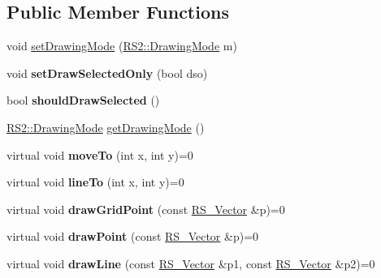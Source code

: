 \subsection*{Public Member Functions}
\begin{DoxyCompactItemize}
\item 
void \hyperlink{classRS__Painter_a88a1a453bc7e08f214052c3adf0503b8}{set\-Drawing\-Mode} (\hyperlink{classRS2_a67196f135592d0f8eff894bd126685b2}{R\-S2\-::\-Drawing\-Mode} m)
\item 
\hypertarget{classRS__Painter_a8d1570665fffca8525b17a549a551873}{void {\bfseries set\-Draw\-Selected\-Only} (bool dso)}\label{classRS__Painter_a8d1570665fffca8525b17a549a551873}

\item 
\hypertarget{classRS__Painter_a60040b54a2cf9f3c1a1b0adc8a96dd82}{bool {\bfseries should\-Draw\-Selected} ()}\label{classRS__Painter_a60040b54a2cf9f3c1a1b0adc8a96dd82}

\item 
\hyperlink{classRS2_a67196f135592d0f8eff894bd126685b2}{R\-S2\-::\-Drawing\-Mode} \hyperlink{classRS__Painter_a80521757acab6e423095a789074351a0}{get\-Drawing\-Mode} ()
\item 
\hypertarget{classRS__Painter_a0aad518b8aede9e847f9743ff474485a}{virtual void {\bfseries move\-To} (int x, int y)=0}\label{classRS__Painter_a0aad518b8aede9e847f9743ff474485a}

\item 
\hypertarget{classRS__Painter_a779a7272bbb90c16e84f2fc18efd2e09}{virtual void {\bfseries line\-To} (int x, int y)=0}\label{classRS__Painter_a779a7272bbb90c16e84f2fc18efd2e09}

\item 
\hypertarget{classRS__Painter_a68549b379070674f7b61b01ce84326f9}{virtual void {\bfseries draw\-Grid\-Point} (const \hyperlink{classRS__Vector}{R\-S\-\_\-\-Vector} \&p)=0}\label{classRS__Painter_a68549b379070674f7b61b01ce84326f9}

\item 
\hypertarget{classRS__Painter_a97193625a8bbe5a72980e12177e28515}{virtual void {\bfseries draw\-Point} (const \hyperlink{classRS__Vector}{R\-S\-\_\-\-Vector} \&p)=0}\label{classRS__Painter_a97193625a8bbe5a72980e12177e28515}

\item 
\hypertarget{classRS__Painter_aca9e841aa5d7749cf5b82b9e5a74368f}{virtual void {\bfseries draw\-Line} (const \hyperlink{classRS__Vector}{R\-S\-\_\-\-Vector} \&p1, const \hyperlink{classRS__Vector}{R\-S\-\_\-\-Vector} \&p2)=0}\label{classRS__Painter_aca9e841aa5d7749cf5b82b9e5a74368f}


\end{DoxyCompactItemize}
